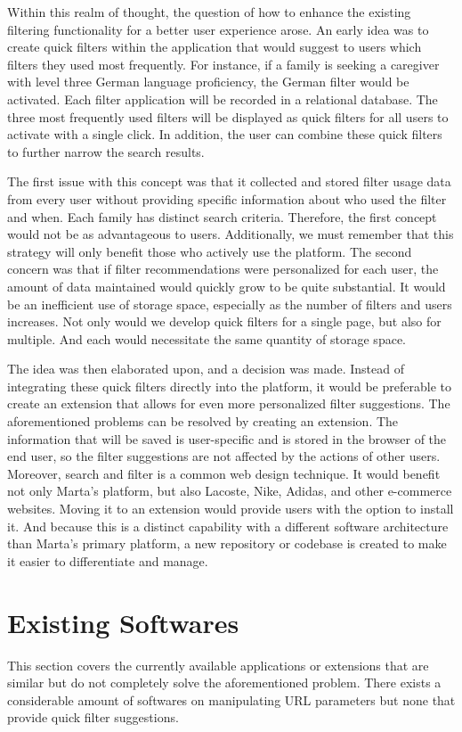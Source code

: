 Within this realm of thought, the question of how to enhance the existing filtering functionality for a better user experience arose. An early idea was to create quick filters within the application that would suggest to users which filters they used most frequently. For instance, if a family is seeking a caregiver with level three German language proficiency, the German filter would be activated. Each filter application will be recorded in a relational database. The three most frequently used filters will be displayed as quick filters for all users to activate with a single click. In addition, the user can combine these quick filters to further narrow the search results.

The first issue with this concept was that it collected and stored filter usage data from every user without providing specific information about who used the filter and when. Each family has distinct search criteria. Therefore, the first concept would not be as advantageous to users. Additionally, we must remember that this strategy will only benefit those who actively use the platform. The second concern was that if filter recommendations were personalized for each user, the amount of data maintained would quickly grow to be quite substantial. It would be an inefficient use of storage space, especially as the number of filters and users increases. Not only would we develop quick filters for a single page, but also for multiple. And each would necessitate the same quantity of storage space.

The idea was then elaborated upon, and a decision was made. Instead of integrating these quick filters directly into the platform, it would be preferable to create an extension that allows for even more personalized filter suggestions. The aforementioned problems can be resolved by creating an extension. The information that will be saved is user-specific and is stored in the browser of the end user, so the filter suggestions are not affected by the actions of other users. Moreover, search and filter is a common web design technique. It would benefit not only Marta's platform, but also Lacoste, Nike, Adidas, and other e-commerce websites. Moving it to an extension would provide users with the option to install it. And because this is a distinct capability with a different software architecture than Marta's primary platform, a new repository or codebase is created to make it easier to differentiate and manage.

\section{Existing Softwares}
This section covers the currently available applications or extensions that are similar but do not completely solve the aforementioned problem. There exists a considerable amount of softwares on manipulating URL parameters but none that provide quick filter suggestions.

